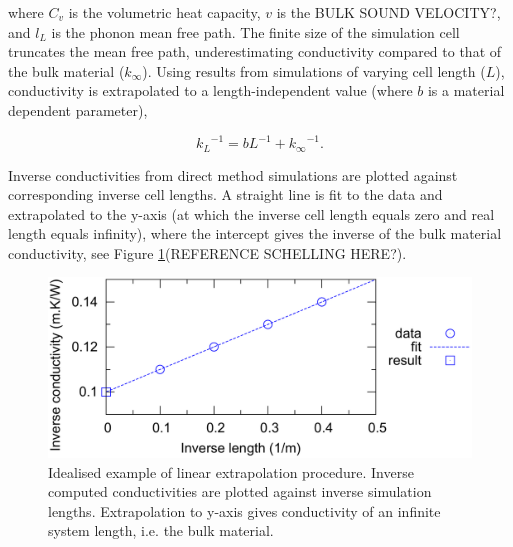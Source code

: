 \documentclass[%
preprint,                                  %
nofootinbib,
 amsmath,amssymb,
 aps,
]{revtex4-1}
\begin{document}
where $C_v$ is the volumetric heat capacity, $v$ is the BULK SOUND VELOCITY?, and $l_L$ is the phonon mean free path. The finite size of the simulation cell truncates the mean free path, underestimating conductivity compared to that of the bulk material ($k_\infty$). Using results from simulations of varying cell length ($L$), conductivity is extrapolated to a length-independent value (where $b$ is a material dependent parameter),

\begin{equation}
{k_{L}}^{-1} = b L^{-1} + {k_{\infty}}^{-1} \label{linear-extrap}.
\end{equation}

Inverse conductivities from direct method simulations are plotted against corresponding inverse cell lengths. A straight line is fit to the data and extrapolated to the y-axis (at which the inverse cell length equals zero and real length equals infinity), where the intercept gives the inverse of the bulk material conductivity, see Figure \ref{fig:ideal}(REFERENCE SCHELLING HERE?).

\begin{figure}[h]
  \includegraphics[width=\linewidth]{images/ideal_extrap.png}
  \caption{Idealised example of linear extrapolation procedure. Inverse computed conductivities are plotted against inverse simulation lengths. Extrapolation to y-axis gives conductivity of an infinite system length, i.e. the bulk material.}
  \label{fig:ideal}
\end{figure}

\end{document}
